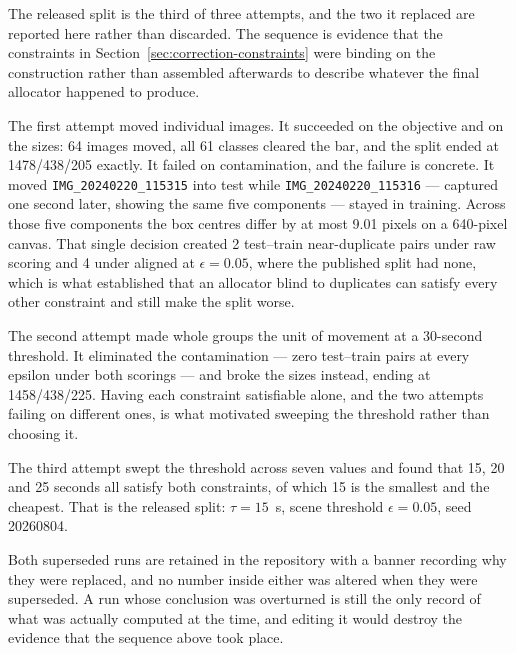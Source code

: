 The released split is the third of three attempts, and the two it replaced are
reported here rather than discarded. The sequence is evidence that the
constraints in Section~\ref{sec:correction-constraints} were binding on the
construction rather than assembled afterwards to describe whatever the final
allocator happened to produce.

The first attempt moved individual images. It succeeded on the objective and on
the sizes: 64 images moved, all 61 classes cleared the bar, and the split ended
at 1478/438/205 exactly. It failed on contamination, and the failure is
concrete. It moved \texttt{IMG\_20240220\_115315} into test while
\texttt{IMG\_20240220\_115316} --- captured one second later, showing the same
five components --- stayed in training. Across those five components the box
centres differ by at most 9.01 pixels on a 640-pixel canvas. That single
decision created 2 test--train near-duplicate pairs under raw scoring and 4
under aligned at $\epsilon = 0.05$, where the published split had none, which is
what established that an allocator blind to duplicates can satisfy every other
constraint and still make the split worse.

The second attempt made whole groups the unit of movement at a 30-second
threshold. It eliminated the contamination --- zero test--train pairs at every
epsilon under both scorings --- and broke the sizes instead, ending at
1458/438/225. Having each constraint satisfiable alone, and the two attempts
failing on different ones, is what motivated sweeping the threshold rather than
choosing it.

The third attempt swept the threshold across seven values and found that 15, 20
and 25 seconds all satisfy both constraints, of which 15 is the smallest and the
cheapest. That is the released split: $\tau = 15$~s, scene threshold
$\epsilon = 0.05$, seed 20260804.

Both superseded runs are retained in the repository with a banner recording why
they were replaced, and no number inside either was altered when they were
superseded. A run whose conclusion was overturned is still the only record of
what was actually computed at the time, and editing it would destroy the
evidence that the sequence above took place.


